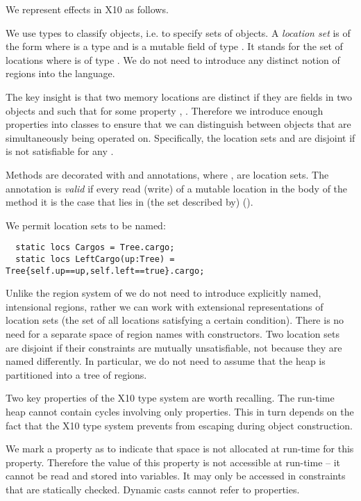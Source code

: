 
We represent effects in X10 as follows. 

We use types to classify objects, i.e.{} to specify sets of
objects. A {\em location set} is of the form  where 
is a type and  is a mutable field of type . It stands
for the set of locations  where  is of type
. We do not need to introduce any distinct notion of regions
into the language.

The key insight is that two memory locations are distinct if they are
fields in two objects  and such that for some property
, . Therefore we introduce enough properties
into classes to ensure that we can distinguish between objects that
are simultaneously being operated on. Specifically, the location sets
 and  are disjoint if
 is not satisfiable for any . 

Methods are decorated with  and 
annotations, where , are location sets. The annotation
is {\em valid} if every read (write) of a mutable location  in the
body of the method it is the case that  lies in (the set
described by)  ().

We permit location sets to be named:
\begin{lstlisting}
  static locs Cargos = Tree.cargo;
  static locs LeftCargo(up:Tree) = Tree{self.up==up,self.left==true}.cargo;
\end{lstlisting}

Unlike the region system of \cite{DPJ} we do not need to introduce
explicitly named, intensional regions, rather we can work with
extensional representations of location sets (the set of all locations
satisfying a certain condition).  There is no need for a separate
space of region names with constructors. Two location sets are
disjoint if their constraints are mutually unsatisfiable, not because
they are named differently. In particular, we do not need to assume
that the heap is partitioned into a tree of regions.

Two key properties of the X10 type system are worth recalling. The run-time
heap cannot contain cycles involving only properties. This in turn
depends on the fact that the X10 type system prevents  from
escaping during object construction\cite{X10-object-initialization}.

We mark a property as  to indicate that space is not
allocated at run-time for this property. Therefore the value of this
property is not accessible at run-time -- it cannot be read and stored
into variables. It may only be accessed in constraints that are
statically checked. Dynamic casts cannot refer to 
properties.

